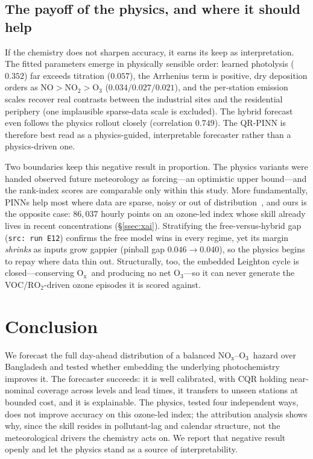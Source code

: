 \documentclass[conference]{IEEEtran}
\newcommand{\nox}{\ensuremath{\mathrm{NO_x}}}
\newcommand{\othree}{\ensuremath{\mathrm{O_3}}}
\newcommand{\notwo}{\ensuremath{\mathrm{NO_2}}}
\newcommand{\ox}{\ensuremath{\mathrm{O_x}}}
\begin{document}
\subsection{The payoff of the physics, and where it should help}\label{ssec:limits}
If the chemistry does not sharpen accuracy, it earns its keep as interpretation. The fitted parameters
emerge in physically sensible order: learned photolysis ($0.352$) far exceeds titration ($0.057$), the
Arrhenius term is positive, dry deposition orders as $\mathrm{NO}>\notwo>\othree$ ($0.034/0.027/0.021$),
and the per-station emission scales recover real contrasts between the industrial sites and the
residential periphery (one implausible sparse-data scale is excluded). The hybrid forecast even follows
the physics rollout closely (correlation $0.749$). The QR-PINN is therefore best read as a
physics-guided, interpretable forecaster rather than a physics-driven one.

Two boundaries keep this negative result in proportion. The physics variants were handed observed future
meteorology as forcing---an optimistic upper bound---and the rank-index scores are comparable only within
this study. More fundamentally, PINNs help most where data are sparse, noisy or out of
distribution~\cite{raissi2019,karniadakis2021,hettige2024}, and ours is the opposite case: $86{,}037$
hourly points on an ozone-led index whose skill already lives in recent concentrations (\S\ref{ssec:xai}).
Stratifying the free-versus-hybrid gap (\texttt{src: run E12}) confirms the free model wins in every
regime, yet its margin \emph{shrinks} as inputs grow gappier (pinball gap $0.046\!\rightarrow\!0.040$), so
the physics begins to repay where data thin out. Structurally, too, the embedded Leighton cycle is
closed---conserving \ox\ and producing no net \othree---so it can never generate the
VOC/$\mathrm{RO_2}$-driven ozone episodes it is scored against.

\section{Conclusion}
We forecast the full day-ahead distribution of a balanced \nox--\othree\ hazard over Bangladesh and
tested whether embedding the underlying photochemistry improves it. The forecaster succeeds: it is well
calibrated, with CQR holding near-nominal coverage across levels and lead times, it transfers to unseen
stations at bounded cost, and it is explainable. The physics, tested four independent ways, does not
improve accuracy on this ozone-led index; the attribution analysis shows why, since the skill resides in
pollutant-lag and calendar structure, not the meteorological drivers the chemistry acts on. We report
that negative result openly and let the physics stand as a source of interpretability.
\end{document}
